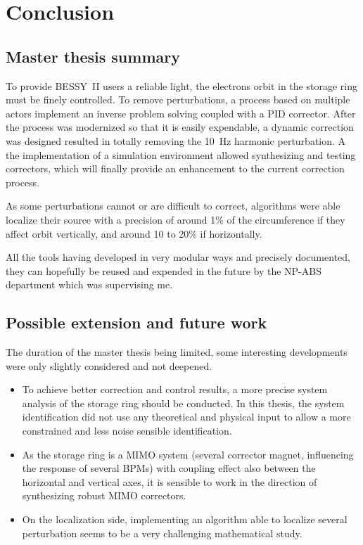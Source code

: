 
\chapter{Conclusion}

\section{Master thesis summary}
To provide BESSY~II users a reliable light, the electrons orbit in the storage ring must be finely controlled. To remove perturbations, a process based on multiple actors implement an inverse problem solving coupled with a PID corrector. After the process was modernized so that it is easily expendable, a dynamic correction was designed resulted in totally removing the \SI{10}{\hertz} harmonic perturbation. A the implementation of a simulation environment allowed synthesizing and testing correctors, which will finally provide an enhancement to the current correction process.

As some perturbations cannot or are difficult to correct, algorithms were able localize their source with a precision of around 1\% of the circumference if they affect orbit vertically, and around 10 to 20\% if horizontally.

All the tools having developed in very modular ways and precisely documented, they can hopefully be reused and expended in the future by the NP-ABS department which was supervising me.

\section{Possible extension and future work}

The duration of the master thesis being limited, some interesting developments were only slightly considered and not deepened.

\begin{itemize}
    \item To achieve better correction and control results, a more precise system analysis of the storage ring should be conducted. In this thesis, the system identification did not use any theoretical and physical input to allow a more constrained and less noise sensible identification. 
    \item As the storage ring is a MIMO system (several corrector magnet, influencing the response of several BPMs) with coupling effect also between the horizontal and vertical axes, it is sensible to work in the direction of synthesizing robust MIMO correctors.
    \item On the localization side, implementing an algorithm able to localize several perturbation seems to be a very challenging mathematical study.
\end{itemize}
